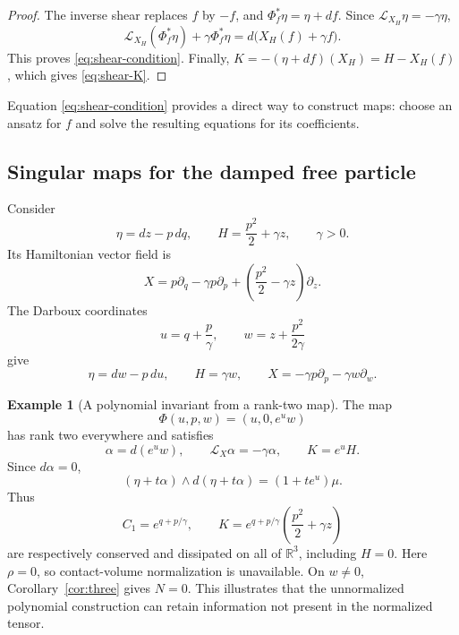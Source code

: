 \documentclass[11pt,a4paper]{article}
\numberwithin{equation}{section}
\theoremstyle{definition}
\newtheorem{example}{Example}
\theoremstyle{remark}
\begin{document}
\begin{proof}
The inverse shear replaces $f$ by $-f$, and
$\Phi_f^*\eta=\eta+df$. Since
$\mathcal L_{X_H}\eta=-\gamma\eta$,
\[
\mathcal L_{X_H}(\Phi_f^*\eta)
+\gamma\Phi_f^*\eta
=d\bigl(X_H(f)+\gamma f\bigr).
\]
This proves \eqref{eq:shear-condition}.
Finally, $K=-(\eta+df)(X_H)=H-X_H(f)$,
which gives \eqref{eq:shear-K}.
\end{proof}

Equation \eqref{eq:shear-condition} provides a direct
way to construct maps: choose an ansatz for $f$ and
solve the resulting equations for its coefficients.



\subsection{Singular maps for the damped free particle}

Consider
\[
\eta=dz-p\,dq,\qquad
H=\frac{p^2}{2}+\gamma z,\qquad \gamma>0.
\]
Its Hamiltonian vector field is
\[
X=p\partial_q-\gamma p\partial_p
+\left(\frac{p^2}{2}-\gamma z\right)\partial_z.
\]
The Darboux coordinates
\begin{equation}
u=q+\frac p\gamma,\qquad
w=z+\frac{p^2}{2\gamma}
\label{eq:free-coordinates}
\end{equation}
give
\begin{equation}
\eta=dw-p\,du,\qquad
H=\gamma w,\qquad
X=-\gamma p\partial_p-\gamma w\partial_w.
\label{eq:free-adapted}
\end{equation}

\begin{example}[A polynomial invariant from a rank-two map]
The map
\[
\Phi(u,p,w)=(u,0,e^u w)
\]
has rank two everywhere and satisfies
\[
\alpha=d(e^u w),\qquad
\mathcal L_X\alpha=-\gamma\alpha,\qquad
K=e^uH.
\]
Since $d\alpha=0$,
\[
(\eta+t\alpha)\wedge d(\eta+t\alpha)
=(1+te^u)\mu.
\]
Thus
\[
C_1=e^{q+p/\gamma},\qquad
K=e^{q+p/\gamma}\left(\frac{p^2}{2}+\gamma z\right)
\]
are respectively conserved and dissipated on all of
$\mathbb R^3$, including $H=0$.
Here $\rho=0$, so contact-volume normalization is
unavailable. On $w\neq0$, Corollary~\ref{cor:three}
gives $N=0$. This illustrates that the unnormalized
polynomial construction can retain information
not present in the normalized tensor.
\end{example}
\end{document}
